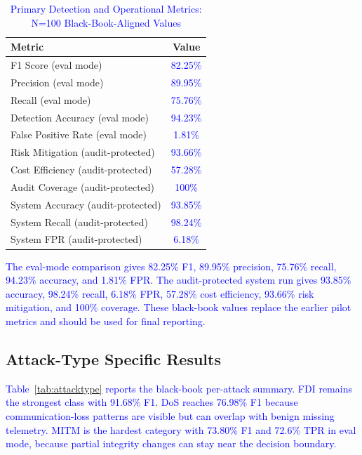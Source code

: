 \documentclass[conference,a4paper]{IEEEtran}
\begin{document}
\begin{table}[htbp]
\caption{\textcolor{blue}{Primary Detection and Operational Metrics: N=100 Black-Book-Aligned Values}}
\begin{center}
\begin{tabular}{|l|c|}
\hline
\textbf{Metric} & \textbf{Value} \\
\hline
F1 Score (eval mode) & \textcolor{blue}{82.25\%} \\
\hline
Precision (eval mode) & \textcolor{blue}{89.95\%} \\
\hline
Recall (eval mode) & \textcolor{blue}{75.76\%} \\
\hline
Detection Accuracy (eval mode) & \textcolor{blue}{94.23\%} \\
\hline
False Positive Rate (eval mode) & \textcolor{blue}{1.81\%} \\
\hline
Risk Mitigation (audit-protected) & \textcolor{blue}{93.66\%} \\
\hline
Cost Efficiency (audit-protected) & \textcolor{blue}{57.28\%} \\
\hline
Audit Coverage (audit-protected) & \textcolor{blue}{100\%} \\
\hline
System Accuracy (audit-protected) & \textcolor{blue}{93.85\%} \\
\hline
System Recall (audit-protected) & \textcolor{blue}{98.24\%} \\
\hline
System FPR (audit-protected) & \textcolor{blue}{6.18\%} \\
\hline
\end{tabular}
\label{tab:primary}
\end{center}
\end{table}

\textcolor{blue}{The eval-mode comparison gives 82.25\% F1, 89.95\% precision, 75.76\% recall, 94.23\% accuracy, and 1.81\% FPR. The audit-protected system run gives 93.85\% accuracy, 98.24\% recall, 6.18\% FPR, 57.28\% cost efficiency, 93.66\% risk mitigation, and 100\% coverage. These black-book values replace the earlier pilot metrics and should be used for final reporting.}

\subsection{Attack-Type Specific Results}

\textcolor{blue}{Table~\ref{tab:attacktype} reports the black-book per-attack summary. FDI remains the strongest class with 91.68\% F1. DoS reaches 76.98\% F1 because communication-loss patterns are visible but can overlap with benign missing telemetry. MITM is the hardest category with 73.80\% F1 and 72.6\% TPR in eval mode, because partial integrity changes can stay near the decision boundary.}
\end{document}

